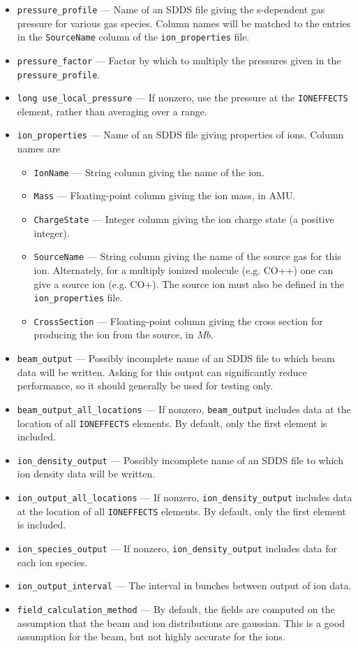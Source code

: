 \documentclass[11pt]{article}
\begin{document}
\begin{itemize}
\item \verb|pressure_profile| --- Name of an SDDS file giving the s-dependent gas pressure for
  various gas species. Column names will be matched to the entries in the \verb|SourceName| column of the
  \verb|ion_properties| file.
\item \verb|pressure_factor| --- Factor by which to multiply the pressures given in the \verb|pressure_profile|.
\item \verb|long use_local_pressure| --- If nonzero, use the pressure at the \verb|IONEFFECTS| element, rather than averaging over a range.
\item \verb|ion_properties| --- Name of an SDDS file giving properties of ions. Column names are
  \begin{itemize}
  \item \verb|IonName| --- String column giving the name of the ion.
  \item \verb|Mass| --- Floating-point column giving the ion mass, in AMU.
  \item \verb|ChargeState| --- Integer column giving the ion charge state (a positive integer).
  \item \verb|SourceName| --- String column giving the name of the source gas for this ion.
    Alternately, for a multiply ionized molecule (e.g. CO++) one can give a source ion (e.g. CO+).  The source ion must also be defined in the \verb|ion_properties| file.
  \item \verb|CrossSection| --- Floating-point column giving the cross section for producing the ion from the source, in $Mb$.
  \end{itemize}
\item \verb|beam_output| --- Possibly incomplete name of an SDDS file to which beam data will be written.
  Asking for this output can significantly reduce performance, so it should generally be used for testing only.
\item \verb|beam_output_all_locations| --- If nonzero, \verb|beam_output| includes data at the location of
  all \verb|IONEFFECTS| elements. By default, only the first element is included.
\item \verb|ion_density_output| --- Possibly incomplete name of an SDDS file to which ion density data will be written.
\item \verb|ion_output_all_locations| --- If nonzero, \verb|ion_density_output| includes data at the location of
  all \verb|IONEFFECTS| elements. By default, only the first element is included.
\item \verb|ion_species_output| --- If nonzero, \verb|ion_density_output| includes data for each ion species.
\item \verb|ion_output_interval| --- The interval in bunches between output of ion data.
\item \verb|field_calculation_method| --- By default, the fields are computed on the
  assumption that the beam and ion distributions are gaussian. This is a good assumption for the beam, but not highly accurate
  for the ions. 


\end{itemize}
\end{document}
